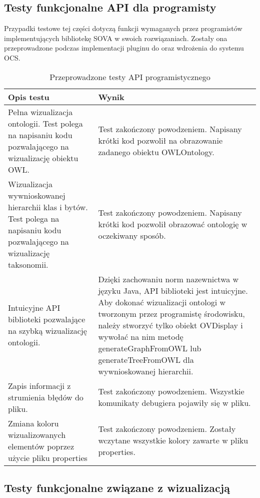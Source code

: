 \subsection{Testy funkcjonalne API dla programisty}

Przypadki testowe tej części dotyczą funkcji wymaganych przez programistów implementujących bibliotekę SOVA w swoich rozwiązaniach. Zostały ona przeprowadzone 
podczas implementacji pluginu do \proteges oraz wdrożenia do systemu OCS. 

\begin{longtable}{|m{7cm}|m{7cm}|} 
\caption{Przeprowadzone testy API programistycznego}
\label{t:funk:api} \\
\hline
\bf{Opis testu} 	&  \bf{Wynik} \\ \hline

Pełna wizualizacja ontologii. Test polega na napisaniu kodu pozwalającego na wizualizację obiektu OWL.
& 
Test zakończony powodzeniem. Napisany krótki kod pozwolił na obrazowanie zadanego obiektu OWLOntology. 
\\ \hline


Wizualizacja wywnioskowanej hierarchii klas i bytów. Test polega na napisaniu kodu pozwalającego na wizualizację taksonomii.
& 
Test zakończony powodzeniem. Napisany krótki kod pozwolił obrazować ontologię w oczekiwany sposób. 
\\ \hline

Intuicyjne API biblioteki pozwalające na szybką wizualizację ontologii.

& Dzięki zachowaniu norm nazewnictwa w języku Java, API biblioteki jest intuicyjne. Aby dokonać wizualizacji ontologi w tworzonym przez programistę środowisku, należy
stworzyć tylko obiekt OVDisplay i wywołać na nim metodę generateGraphFromOWL lub generateTreeFromOWL dla wywnioskowanej hierarchii. 
\\ \hline

Zapis informacji z strumienia błędów do pliku.
& Test zakończony powodzeniem. Wszystkie komunikaty debugiera pojawiły się w pliku. 
\\ \hline


Zmiana koloru wizualizowanych elementów poprzez użycie pliku properties  
& Test zakończony powodzeniem. Zostały wczytane wszystkie kolory zawarte w pliku properties. 
\\ \hline



\end{longtable}

\subsection{Testy funkcjonalne związane z wizualizacją}

